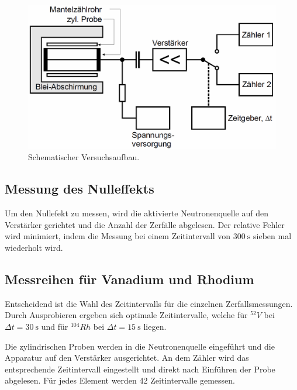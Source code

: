 \begin{figure}
    \centering
    \includegraphics[width=.9\textwidth]{plots/Versuch.png}
    \caption{Schematischer Versuchsaufbau.\cite{Versuchsanleitung}}
    \label{fig:schVersuch}
\end{figure}

\subsection{Messung des Nulleffekts}
Um den Nullefekt zu messen, wird die aktivierte Neutronenquelle auf den Verstärker gerichtet und die Anzahl der Zerfälle abgelesen.
Der relative Fehler wird minimiert, indem die Messung bei einem Zeitintervall von $\SI{300}{\second}$ sieben mal wiederholt wird.

\subsection{Messreihen für Vanadium und Rhodium}
Entscheidend ist die Wahl des Zeitintervalls für die einzelnen Zerfallsmessungen. Durch Ausprobieren ergeben sich optimale Zeitintervalle, welche für $^{52}V$ bei $\Delta t = \SI{30}{\second}$
und für $^{104}Rh$ bei $\Delta t = \SI{15}{\second}$ liegen.

Die zylindrischen Proben werden in die Neutronenquelle eingeführt und die Apparatur auf den Verstärker ausgerichtet. An dem Zähler wird das entsprechende Zeitintervall eingestellt
und direkt nach Einführen der Probe abgelesen.
Für jedes Element werden 42 Zeitintervalle gemessen.